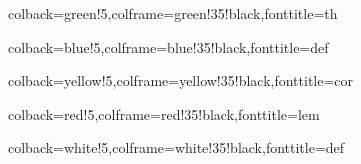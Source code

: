 \usepackage[margin=1in]{geometry}
\usepackage[utf8]{inputenc}
\usepackage{textcomp}
\usepackage{amssymb}
\usepackage{natbib}
\usepackage{graphicx}
\usepackage{gensymb}
\usepackage{amsthm, amsmath, mathtools, mathrsfs}
\usepackage[dvipsnames]{xcolor}
\usepackage{enumerate}
\usepackage{mdframed}
\usepackage[most]{tcolorbox}
\usepackage{csquotes}
\usepackage{mleftright}
\usepackage{soul}
\usepackage{cancel}
\usepackage{algpseudocode}
\usepackage{tcolorbox}




\newcommand{\R}{\mathbb{R}}
\newcommand{\Z}{\mathbb{Z}}
\newcommand{\N}{\mathbb{N}}
\newcommand{\Q}{\mathbb{Q}}
\newcommand{\C}{\mathbb{C}}
\newcommand{\E}{\mathbb{E}}
\newcommand{\F}{\mathbb{F}}
\newcommand{\PR}{\mathbb{P}}
\newcommand{\BigO}{\mathcal{O}}
\newcommand{\code}[1]{\texttt{#1}}
\newcommand{\mdiamond}{$\diamondsuit$}
\newcommand{\PowerSet}{\mathcal{P}}
\newcommand{\Mod}[1]{\ (\mathrm{mod}\ #1)}
\newcommand{\cyclic}[1]{\langle #1 \rangle}
\newcommand{\bsttt}[1]{\string\ \hspace{-4pt}#1{}}
\DeclareMathOperator{\lcm}{lcm}

\DeclareMathOperator{\sym}{Sym}
\DeclareMathOperator{\sgn}{sgn}
\DeclareMathOperator{\aut}{Aut}
\DeclareMathOperator{\id}{id}
\DeclareMathOperator{\im}{im}
\DeclareMathOperator{\ch}{char}

\DeclareMathOperator{\cond}{cond}

\newtheorem*{proposition}{Proposition}


{colback=green!5,colframe=green!35!black,fonttitle=\bfseries}{th}

{colback=blue!5,colframe=blue!35!black,fonttitle=\bfseries}{def}

{colback=yellow!5,colframe=yellow!35!black,fonttitle=\bfseries}{cor}

{colback=red!5,colframe=red!35!black,fonttitle=\bfseries}{lem}

{colback=white!5,colframe=white!35!black,fonttitle=\bfseries}{def}

